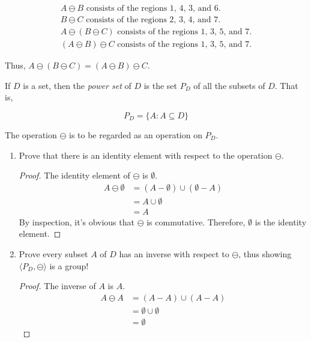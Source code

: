 \documentclass[twoside]{amsart}
\begin{document}
\begin{enumerate}[A.]
   \begin{gather*}
      A \ominus B \text{ consists of the regions 1, 4, 3, and 6.} \\
      B \ominus C \text{ consists of the regions 2, 3, 4, and 7.} \\
      A \ominus (B \ominus C) \text{ consists of the regions 1, 3, 5, and 7.}
      \\
      (A \ominus B) \ominus C \text{ consists of the regions 1, 3, 5, and 7.} 
   \end{gather*}

   \noindent Thus, $A \ominus (B \ominus C) = (A \ominus B) \ominus C$.


   If $D$ is a set, then the \emph{power set} of $D$ is the set $P_D$
   of all the subsets of $D$. That is,
   \begin{center}
   $$ P_D = \{ A : A \subseteq D \} $$
   \end{center}

   The operation $\ominus$ is to be regarded as an operation on $P_D$.

   \begin{enumerate}[1.]

   \item Prove that there is an identity element with respect to the operation
   $\ominus$. 

   \begin{proof}
   The identity element of $\ominus$ is $\emptyset$. 
   \begin{align*}
      A \ominus \emptyset & = (A - \emptyset) \cup (\emptyset - A) \\
                          & = A \cup \emptyset \\
			  & = A
   \end{align*}
   By inspection, it's obvious that $\ominus$ is commutative. Therefore,
   $\emptyset$ is the identity element.
   \end{proof}

   \item Prove every subset $A$ of $D$ has an inverse with respect to 
   $\ominus$, thus showing $\langle P_D,\ominus \rangle$ is a group!

   \begin{proof}
      The inverse of $A$ is $A$.
      \begin{align*}
         A \ominus A & = (A - A) \cup (A - A) \\
	             & = \emptyset \cup \emptyset \\
		     & = \emptyset
      \end{align*}
   \end{proof}


\end{enumerate}
\end{enumerate}
\end{document}
